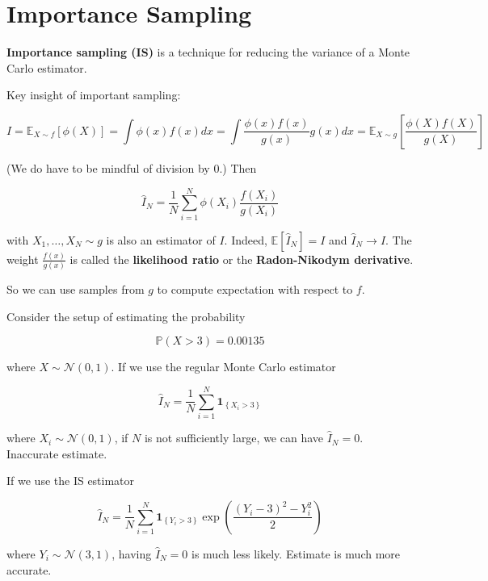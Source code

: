 \documentclass{report}
\begin{document}
\section{Importance Sampling}

\begin{definition}
    \textbf{Importance sampling (IS)} is a technique for reducing the variance of a Monte Carlo estimator.

    Key insight of important sampling:

    $$
    I=\mathbb{E}_{X \sim f}[\phi(X)]=\int \phi(x) f(x) d x=\int \frac{\phi(x) f(x)}{g(x)} g(x) d x=\mathbb{E}_{X \sim g}\left[\frac{\phi(X) f(X)}{g(X)}\right]
    $$

    (We do have to be mindful of division by 0.) Then

    $$
    \hat{I}_{N}=\frac{1}{N} \sum_{i=1}^{N} \phi\left(X_{i}\right) \frac{f\left(X_{i}\right)}{g\left(X_{i}\right)}
    $$

    with $X_{1}, \ldots, X_{N} \sim g$ is also an estimator of $I$.
    Indeed, $\mathbb{E}\left[\hat{I}_{N}\right]=I$ and $\hat{I}_{N} \rightarrow I$.
    The weight $\frac{f(x)}{g(x)}$ is called the \textbf{likelihood ratio} or the \textbf{Radon-Nikodym derivative}.

    So we can use samples from $g$ to compute expectation with respect to $f$.
\end{definition}

\begin{example}[13.6][IS Example]
    Consider the setup of estimating the probability

    $$
    \mathbb{P}(X>3)=0.00135
    $$

    where $X \sim \mathcal{N}(0,1)$. If we use the regular Monte Carlo estimator

    $$
    \hat{I}_{N}=\frac{1}{N} \sum_{i=1}^{N} \mathbf{1}_{\left\{X_{i}>3\right\}}
    $$

    where $X_{i} \sim \mathcal{N}(0,1)$, if $N$ is not sufficiently large, we can have $\hat{I}_{N}=0$. Inaccurate estimate.

    If we use the IS estimator

    $$
    \hat{I}_{N}=\frac{1}{N} \sum_{i=1}^{N} \mathbf{1}_{\left\{Y_{i}>3\right\}} \exp \left(\frac{\left(Y_{i}-3\right)^{2}-Y_{i}^{2}}{2}\right)
    $$

    where $Y_{i} \sim \mathcal{N}(3,1)$, having $\hat{I}_{N}=0$ is much less likely. Estimate is much more accurate.
\end{example}
\end{document}
